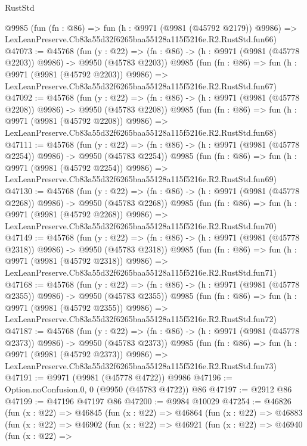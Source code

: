 \begin{lexlean}{RustStd}
\begin{coremodule}
    @9985
    (fun (fn : @86) =>
    fun (h : @9971 (@9981 (@45792 @2179)) @9986) =>
    LexLeanPreserve.Cb83a55d32f6265baa55128a115f5216e.R2.RustStd.fun66)
@47073 := @45768
    (fun (y : @22) =>
    (fn : @86) -> (h : @9971 (@9981 (@45778 @2203)) @9986) -> @9950 (@45783 @2203))
    @9985
    (fun (fn : @86) =>
    fun (h : @9971 (@9981 (@45792 @2203)) @9986) =>
    LexLeanPreserve.Cb83a55d32f6265baa55128a115f5216e.R2.RustStd.fun67)
@47092 := @45768
    (fun (y : @22) =>
    (fn : @86) -> (h : @9971 (@9981 (@45778 @2208)) @9986) -> @9950 (@45783 @2208))
    @9985
    (fun (fn : @86) =>
    fun (h : @9971 (@9981 (@45792 @2208)) @9986) =>
    LexLeanPreserve.Cb83a55d32f6265baa55128a115f5216e.R2.RustStd.fun68)
@47111 := @45768
    (fun (y : @22) =>
    (fn : @86) -> (h : @9971 (@9981 (@45778 @2254)) @9986) -> @9950 (@45783 @2254))
    @9985
    (fun (fn : @86) =>
    fun (h : @9971 (@9981 (@45792 @2254)) @9986) =>
    LexLeanPreserve.Cb83a55d32f6265baa55128a115f5216e.R2.RustStd.fun69)
@47130 := @45768
    (fun (y : @22) =>
    (fn : @86) -> (h : @9971 (@9981 (@45778 @2268)) @9986) -> @9950 (@45783 @2268))
    @9985
    (fun (fn : @86) =>
    fun (h : @9971 (@9981 (@45792 @2268)) @9986) =>
    LexLeanPreserve.Cb83a55d32f6265baa55128a115f5216e.R2.RustStd.fun70)
@47149 := @45768
    (fun (y : @22) =>
    (fn : @86) -> (h : @9971 (@9981 (@45778 @2318)) @9986) -> @9950 (@45783 @2318))
    @9985
    (fun (fn : @86) =>
    fun (h : @9971 (@9981 (@45792 @2318)) @9986) =>
    LexLeanPreserve.Cb83a55d32f6265baa55128a115f5216e.R2.RustStd.fun71)
@47168 := @45768
    (fun (y : @22) =>
    (fn : @86) -> (h : @9971 (@9981 (@45778 @2355)) @9986) -> @9950 (@45783 @2355))
    @9985
    (fun (fn : @86) =>
    fun (h : @9971 (@9981 (@45792 @2355)) @9986) =>
    LexLeanPreserve.Cb83a55d32f6265baa55128a115f5216e.R2.RustStd.fun72)
@47187 := @45768
    (fun (y : @22) =>
    (fn : @86) -> (h : @9971 (@9981 (@45778 @2373)) @9986) -> @9950 (@45783 @2373))
    @9985
    (fun (fn : @86) =>
    fun (h : @9971 (@9981 (@45792 @2373)) @9986) =>
    LexLeanPreserve.Cb83a55d32f6265baa55128a115f5216e.R2.RustStd.fun73)
@47191 := @9971 (@9981 (@45778 @4722)) @9986
@47196 := Option.noConfusion.{0, 0} (@9950 (@45783 @4722)) @86
@47197 := @2912 @86
@47199 := @47196 @47197 @86
@47200 := @9984 @10029
@47254 := @46826
    (fun (x : @22) =>
    @46845
      (fun (x : @22) =>
      @46864
        (fun (x : @22) =>
        @46883
          (fun (x : @22) =>
          @46902
            (fun (x : @22) =>
            @46921
              (fun (x : @22) =>
              @46940
                (fun (x : @22) =>

\end{coremodule}
\end{lexlean}
